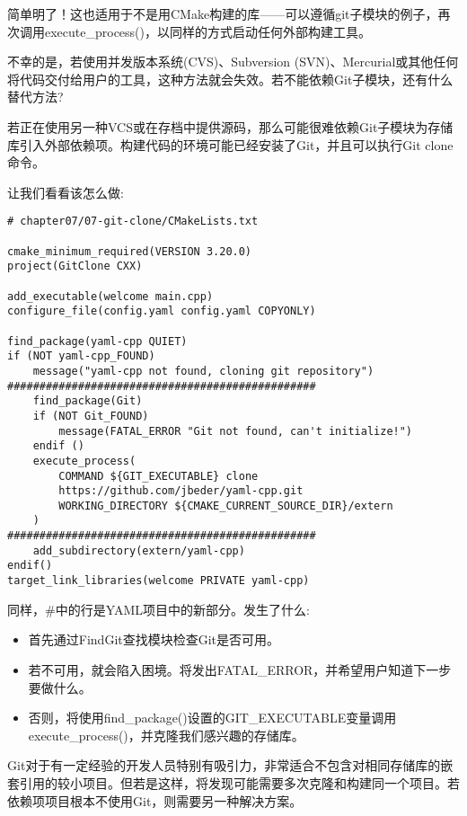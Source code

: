简单明了！这也适用于不是用CMake构建的库——可以遵循git子模块的例子，再次调用execute\_process()，以同样的方式启动任何外部构建工具。

不幸的是，若使用并发版本系统(CVS)、Subversion (SVN)、Mercurial或其他任何将代码交付给用户的工具，这种方法就会失效。若不能依赖Git子模块，还有什么替代方法?


若正在使用另一种VCS或在存档中提供源码，那么可能很难依赖Git子模块为存储库引入外部依赖项。构建代码的环境可能已经安装了Git，并且可以执行Git clone命令。

让我们看看该怎么做:

\begin{lstlisting}[style=styleCMake]
# chapter07/07-git-clone/CMakeLists.txt

cmake_minimum_required(VERSION 3.20.0)
project(GitClone CXX)

add_executable(welcome main.cpp)
configure_file(config.yaml config.yaml COPYONLY)

find_package(yaml-cpp QUIET)
if (NOT yaml-cpp_FOUND)
	message("yaml-cpp not found, cloning git repository")
################################################
	find_package(Git)
	if (NOT Git_FOUND)
		message(FATAL_ERROR "Git not found, can't initialize!")
	endif ()
	execute_process(
		COMMAND ${GIT_EXECUTABLE} clone
		https://github.com/jbeder/yaml-cpp.git
		WORKING_DIRECTORY ${CMAKE_CURRENT_SOURCE_DIR}/extern
	)
################################################
	add_subdirectory(extern/yaml-cpp)
endif()
target_link_libraries(welcome PRIVATE yaml-cpp)
\end{lstlisting}

同样，\#中的行是YAML项目中的新部分。发生了什么:

\begin{itemize}
\item 
首先通过FindGit查找模块检查Git是否可用。

\item 
若不可用，就会陷入困境。将发出FATAL\_ERROR，并希望用户知道下一步要做什么。

\item 
否则，将使用find\_package()设置的GIT\_EXECUTABLE变量调用execute\_process()，并克隆我们感兴趣的存储库。
\end{itemize}

Git对于有一定经验的开发人员特别有吸引力，非常适合不包含对相同存储库的嵌套引用的较小项目。但若是这样，将发现可能需要多次克隆和构建同一个项目。若依赖项项目根本不使用Git，则需要另一种解决方案。



















